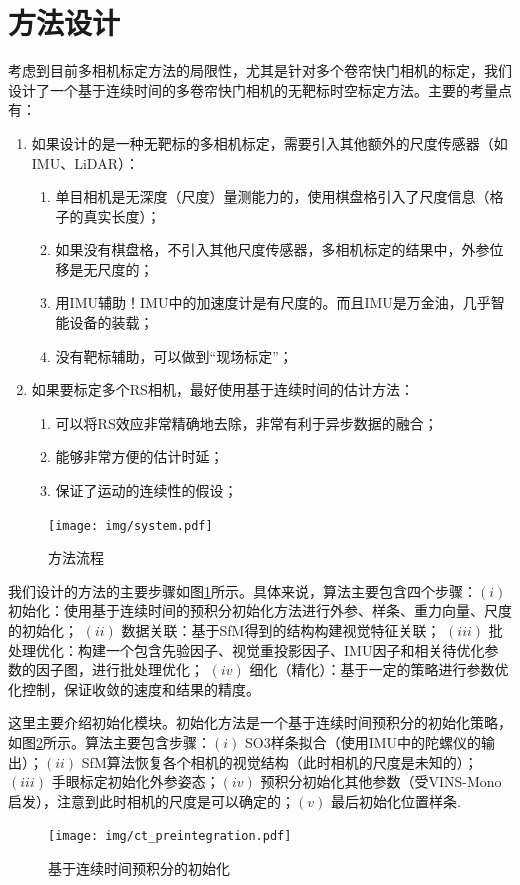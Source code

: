 \documentclass[12pt, twocolumn]{article}
\newcommand\normf{\fangsong}
\begin{document}
	\section{\normf 方法设计}
	考虑到目前多相机标定方法的局限性，尤其是针对多个卷帘快门相机的标定，我们设计了一个基于连续时间的多卷帘快门相机的无靶标时空标定方法。主要的考量点有：
	\begin{enumerate}
	\item 如果设计的是一种无靶标的多相机标定，需要引入其他额外的尺度传感器（如IMU、LiDAR）：
	\begin{enumerate}
	\item 单目相机是无深度（尺度）量测能力的，使用棋盘格引入了尺度信息（格子的真实长度）；
	\item 如果没有棋盘格，不引入其他尺度传感器，多相机标定的结果中，外参位移是无尺度的；
	\item 用IMU辅助！IMU中的加速度计是有尺度的。而且IMU是万金油，几乎智能设备的装载；
	\item 没有靶标辅助，可以做到“现场标定”；
	\end{enumerate}
	
	\item 如果要标定多个RS相机，最好使用基于连续时间的估计方法：
	\begin{enumerate}
	\item 可以将RS效应非常精确地去除，非常有利于异步数据的融合；
	
	\item 能够非常方便的估计时延；
	
	\item 保证了运动的连续性的假设；
	\end{enumerate}
	\end{enumerate}
	
	\begin{figure}[h]
		\centering
		\texttt{[image: img/system.pdf]}
		\caption{\normf 方法流程}
		\label{fig:方法流程}
	\end{figure}
	我们设计的方法的主要步骤如图\ref{fig:方法流程}所示。具体来说，算法主要包含四个步骤：$(i)$ 初始化：使用基于连续时间的预积分初始化方法进行外参、样条、重力向量、尺度的初始化；
	$(ii)$ 数据关联：基于SfM得到的结构构建视觉特征关联；
	$(iii)$  批处理优化：构建一个包含先验因子、视觉重投影因子、IMU因子和相关待优化参数的因子图，进行批处理优化；
	$(iv)$ 细化（精化）：基于一定的策略进行参数优化控制，保证收敛的速度和结果的精度。
	
	这里主要介绍初始化模块。初始化方法是一个基于连续时间预积分的初始化策略，如图\ref{fig:基于连续时间预积分的初始化}所示。算法主要包含步骤：$(i)$ SO3样条拟合（使用IMU中的陀螺仪的输出）；$(ii)$ SfM算法恢复各个相机的视觉结构（此时相机的尺度是未知的）；$(iii)$ 手眼标定初始化外参姿态；$(iv)$ 预积分初始化其他参数（受VINS-Mono启发），注意到此时相机的尺度是可以确定的；$(v)$ 最后初始化位置样条.
	\begin{figure}[h]
		\centering
		\texttt{[image: img/ct\_preintegration.pdf]}
		\caption{\normf 基于连续时间预积分的初始化}
		\label{fig:基于连续时间预积分的初始化}
	\end{figure}
	
\end{document}
